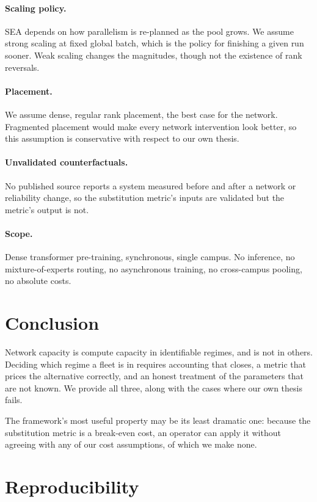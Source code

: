 \documentclass[11pt]{article}
\begin{document}
\paragraph{Scaling policy.} SEA depends on how parallelism is re-planned as the
pool grows. We assume strong scaling at fixed global batch, which is the policy
for finishing a given run sooner. Weak scaling changes the magnitudes, though
not the existence of rank reversals.

\paragraph{Placement.} We assume dense, regular rank placement, the best case for
the network. Fragmented placement would make every network intervention look
better, so this assumption is conservative with respect to our own thesis.

\paragraph{Unvalidated counterfactuals.} No published source reports a system
measured before and after a network or reliability change, so the substitution
metric's inputs are validated but the metric's output is not.

\paragraph{Scope.} Dense transformer pre-training, synchronous, single campus.
No inference, no mixture-of-experts routing, no asynchronous training, no
cross-campus pooling, no absolute costs.

\section{Conclusion}

Network capacity is compute capacity in identifiable regimes, and is not in
others. Deciding which regime a fleet is in requires accounting that closes,
a metric that prices the alternative correctly, and an honest treatment of the
parameters that are not known. We provide all three, along with the cases where
our own thesis fails.

The framework's most useful property may be its least dramatic one: because the
substitution metric is a break-even cost, an operator can apply it without
agreeing with any of our cost assumptions, of which we make none.

\section*{Reproducibility}
\end{document}
